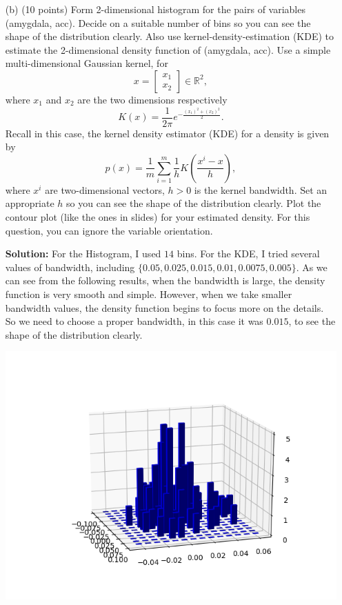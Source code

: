 \documentclass[twoside,12pt]{article}
\begin{document}
\begin{enumerate}
 
 \item[(b)] (10 points) Form 2-dimensional histogram for the pairs of variables (\textsf{amygdala}, \textsf{acc}). Decide on a suitable number of bins so you can see the shape of the distribution clearly. Also use kernel-density-estimation (KDE) to estimate the 2-dimensional density function of (\textsf{amygdala}, \textsf{acc}). Use a simple multi-dimensional Gaussian kernel, for \[x = \begin{bmatrix}x_1\\x_2\end{bmatrix}\in \mathbb R^2,\] where $x_1$ and $x_2$ are the two dimensions respectively \[K(x) = \frac{1}{2\pi} e^{-\frac{(x_1)^2 + (x_2)^2}{2}}.\] Recall in this case, the kernel density estimator (KDE) for a density is given by
 \[
 p(x) = \frac 1 m \sum_{i=1}^m \frac 1 h
 K\left(
 \frac{x^i - x}{h}
 \right),
 \]
where $x^i$ are two-dimensional vectors, $h >0$ is the kernel bandwidth. Set an appropriate $h$ so you can see the shape of the distribution clearly. Plot the contour plot (like the ones in slides) for your estimated density. For this question, you can ignore the variable \textsf{orientation}. 
\begin{tcolorbox}
 \textbf{Solution:} For the Histogram, I used $14$ bins. For the KDE, I tried several values of bandwidth, including $\{0.05, 0.025, 0.015, 0.01, 0.0075, 0.005\}$. As we can see from the following results, when the bandwidth is large, the density function is very smooth and simple. However, when we take smaller bandwidth values, the density function begins to focus more on the details. So we need to choose a proper bandwidth, in this case it was $0.015$, to see the shape of the distribution clearly.  
 \end{tcolorbox}
 \begin{center}
 \includegraphics[width=.6\textwidth]{2d_hist.png}\\

\end{center}
\end{enumerate}
\end{document}
